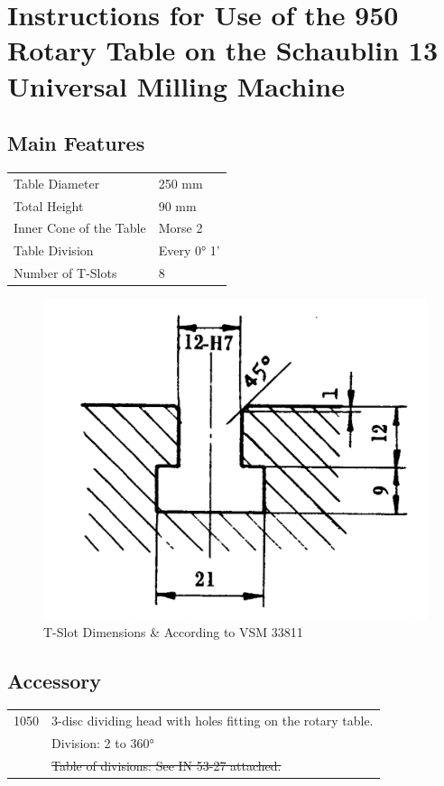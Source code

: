 \appendix


\chapter{Instructions for Use of the 950 Rotary Table on the Schaublin 13 Universal Milling Machine}

\section*{Main Features}

\begin{tabular}{@{}ll@{}}
    Table Diameter          & 250 mm      \\
    Total Height            & 90 mm       \\
    Inner Cone of the Table & Morse 2     \\
    Table Division          & Every 0° 1' \\
    Number of T-Slots       & 8           \\
\end{tabular}

\begin{figure}[h]
    \centering
    \includegraphics[width=0.6\linewidth]{images/rotary_table_t_slot_dimensions}
    \caption{T-Slot Dimensions \& According to VSM 33811}
    \label{fig:rotary_table_t_slot_dimensions}
\end{figure}


\section*{Accessory}

\begin{tabular}{@{}ll@{}}
    1050 & 3-disc dividing head with holes fitting on the rotary table. \\
    & Division: 2 to 360°                                          \\
    & \sout{Table of divisions: See IN 53-27 attached.}
\end{tabular}

